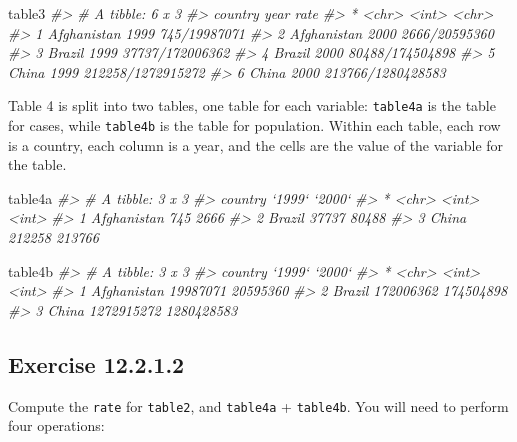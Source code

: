 \documentclass[]{book}
\newenvironment{Shaded}{\begin{snugshade}}{\end{snugshade}}
\newcommand{\CommentTok}[1]{\textcolor[rgb]{0.56,0.35,0.01}{\textit{#1}}}
\newcommand{\NormalTok}[1]{#1}
\theoremstyle{plain}
\theoremstyle{remark}
\begin{document}
\begin{Shaded}
\begin{Highlighting}[]
\NormalTok{table3}
\CommentTok{#> # A tibble: 6 x 3}
\CommentTok{#>   country      year rate             }
\CommentTok{#> * <chr>       <int> <chr>            }
\CommentTok{#> 1 Afghanistan  1999 745/19987071     }
\CommentTok{#> 2 Afghanistan  2000 2666/20595360    }
\CommentTok{#> 3 Brazil       1999 37737/172006362  }
\CommentTok{#> 4 Brazil       2000 80488/174504898  }
\CommentTok{#> 5 China        1999 212258/1272915272}
\CommentTok{#> 6 China        2000 213766/1280428583}
\end{Highlighting}
\end{Shaded}

Table 4 is split into two tables, one table for each variable: \texttt{table4a} is the table for cases, while \texttt{table4b} is the table for population. Within each table, each row is a country, each column is a year, and the cells are the value of the variable for the table.

\begin{Shaded}
\begin{Highlighting}[]
\NormalTok{table4a}
\CommentTok{#> # A tibble: 3 x 3}
\CommentTok{#>   country     `1999` `2000`}
\CommentTok{#> * <chr>        <int>  <int>}
\CommentTok{#> 1 Afghanistan    745   2666}
\CommentTok{#> 2 Brazil       37737  80488}
\CommentTok{#> 3 China       212258 213766}
\end{Highlighting}
\end{Shaded}

\begin{Shaded}
\begin{Highlighting}[]
\NormalTok{table4b}
\CommentTok{#> # A tibble: 3 x 3}
\CommentTok{#>   country         `1999`     `2000`}
\CommentTok{#> * <chr>            <int>      <int>}
\CommentTok{#> 1 Afghanistan   19987071   20595360}
\CommentTok{#> 2 Brazil       172006362  174504898}
\CommentTok{#> 3 China       1272915272 1280428583}
\end{Highlighting}
\end{Shaded}

\hypertarget{exercise-12.2.1.2}{%
\subsection*{\texorpdfstring{Exercise {12.2.1.2}}{Exercise 12.2.1.2}}\label{exercise-12.2.1.2}}

Compute the \texttt{rate} for \texttt{table2}, and \texttt{table4a} + \texttt{table4b}. You will need to perform four operations:
\end{document}
